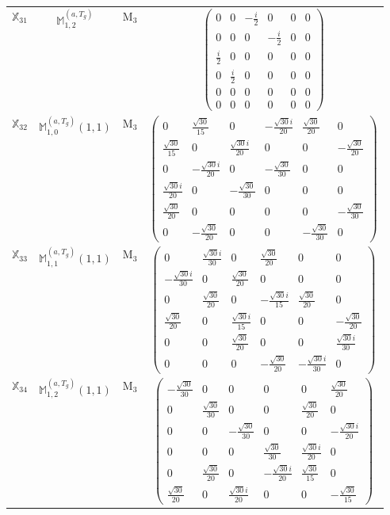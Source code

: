 \documentclass[fleqn,10pt,landscape]{article}
\begin{document}
\begin{itemize}
\begin{center}
\begin{longtable}{c|c|c|c}
$ \mathbb{X}_{31} $ & $\mathbb{M}_{1,2}^{(a,T_{g})}$ & M$_{3}$ & $\begin{pmatrix} 0 & 0 & - \frac{i}{2} & 0 & 0 & 0 \\ 0 & 0 & 0 & - \frac{i}{2} & 0 & 0 \\ \frac{i}{2} & 0 & 0 & 0 & 0 & 0 \\ 0 & \frac{i}{2} & 0 & 0 & 0 & 0 \\ 0 & 0 & 0 & 0 & 0 & 0 \\ 0 & 0 & 0 & 0 & 0 & 0 \end{pmatrix}$ \\
$ \mathbb{X}_{32} $ & $\mathbb{M}_{1,0}^{(a,T_{g})}(1,1)$ & M$_{3}$ & $\begin{pmatrix} 0 & \frac{\sqrt{30}}{15} & 0 & - \frac{\sqrt{30} i}{20} & \frac{\sqrt{30}}{20} & 0 \\ \frac{\sqrt{30}}{15} & 0 & \frac{\sqrt{30} i}{20} & 0 & 0 & - \frac{\sqrt{30}}{20} \\ 0 & - \frac{\sqrt{30} i}{20} & 0 & - \frac{\sqrt{30}}{30} & 0 & 0 \\ \frac{\sqrt{30} i}{20} & 0 & - \frac{\sqrt{30}}{30} & 0 & 0 & 0 \\ \frac{\sqrt{30}}{20} & 0 & 0 & 0 & 0 & - \frac{\sqrt{30}}{30} \\ 0 & - \frac{\sqrt{30}}{20} & 0 & 0 & - \frac{\sqrt{30}}{30} & 0 \end{pmatrix}$ \\
$ \mathbb{X}_{33} $ & $\mathbb{M}_{1,1}^{(a,T_{g})}(1,1)$ & M$_{3}$ & $\begin{pmatrix} 0 & \frac{\sqrt{30} i}{30} & 0 & \frac{\sqrt{30}}{20} & 0 & 0 \\ - \frac{\sqrt{30} i}{30} & 0 & \frac{\sqrt{30}}{20} & 0 & 0 & 0 \\ 0 & \frac{\sqrt{30}}{20} & 0 & - \frac{\sqrt{30} i}{15} & \frac{\sqrt{30}}{20} & 0 \\ \frac{\sqrt{30}}{20} & 0 & \frac{\sqrt{30} i}{15} & 0 & 0 & - \frac{\sqrt{30}}{20} \\ 0 & 0 & \frac{\sqrt{30}}{20} & 0 & 0 & \frac{\sqrt{30} i}{30} \\ 0 & 0 & 0 & - \frac{\sqrt{30}}{20} & - \frac{\sqrt{30} i}{30} & 0 \end{pmatrix}$ \\
$ \mathbb{X}_{34} $ & $\mathbb{M}_{1,2}^{(a,T_{g})}(1,1)$ & M$_{3}$ & $\begin{pmatrix} - \frac{\sqrt{30}}{30} & 0 & 0 & 0 & 0 & \frac{\sqrt{30}}{20} \\ 0 & \frac{\sqrt{30}}{30} & 0 & 0 & \frac{\sqrt{30}}{20} & 0 \\ 0 & 0 & - \frac{\sqrt{30}}{30} & 0 & 0 & - \frac{\sqrt{30} i}{20} \\ 0 & 0 & 0 & \frac{\sqrt{30}}{30} & \frac{\sqrt{30} i}{20} & 0 \\ 0 & \frac{\sqrt{30}}{20} & 0 & - \frac{\sqrt{30} i}{20} & \frac{\sqrt{30}}{15} & 0 \\ \frac{\sqrt{30}}{20} & 0 & \frac{\sqrt{30} i}{20} & 0 & 0 & - \frac{\sqrt{30}}{15} \end{pmatrix}$ \\

\end{longtable}
\end{center}
\end{itemize}
\end{document}

